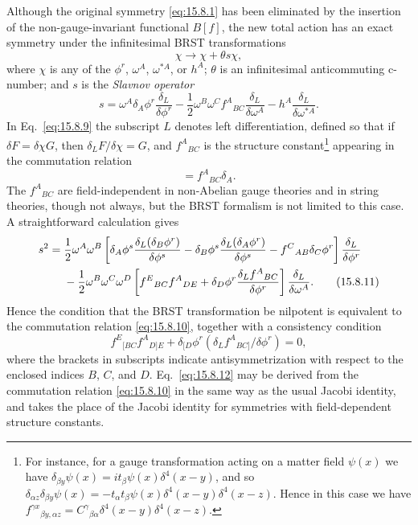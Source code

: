 Although the original symmetry \eqref{eq:15.8.1} has been eliminated by the insertion of the non-gauge-invariant functional $B[f]$, the new total action has an exact symmetry under the infinitesimal BRST transformations
\begin{equation}
 \chi\longrightarrow\chi+\theta s\chi,
 \tag{15.8.8}\label{eq:15.8.8}
\end{equation}
where $\chi$ is any of the $\phi^r$, $\omega^A$, $\omega^{*A}$, or $h^A$; $\theta$ is an infinitesimal anticommuting c-number; and $s$ is the \emph{Slavnov operator}
\begin{equation}
 s=\omega^A\delta_A\phi^r\frac{\delta_L}{\delta\phi^r}
 -\frac{1}{2}\omega^B\omega^Cf^A{}_{BC}\frac{\delta_L}{\delta\omega^A}
 -h^A\frac{\delta_L}{\delta\omega^{*A}}.
 \tag{15.8.9}\label{eq:15.8.9}
\end{equation}
In Eq.~\eqref{eq:15.8.9} the subscript $L$ denotes left differentiation, defined so that if $\delta F=\delta\chi G$, then $\delta_LF/\delta\chi=G$, and $f^A{}_{BC}$ is the structure constant\footnote{For instance, for a gauge transformation acting on a matter field $\psi(x)$ we have $\delta_{\beta y}\psi(x)=it_\beta\psi(x)\delta^4(x-y)$, and so $\delta_{\alpha z}\delta_{\beta y}\psi(x)=-t_\alpha t_\beta\psi(x)\delta^4(x-y)\delta^4(x-z)$. Hence in this case we have $f^{\gamma x}{}_{\beta y,\alpha z}=C^\gamma{}_{\beta\alpha}\delta^4(x-y)\delta^4(x-z)$.} appearing in the commutation relation
\begin{equation}
 [\delta_B,\delta_C]=f^A{}_{BC}\delta_A.
 \tag{15.8.10}\label{eq:15.8.10}
\end{equation}
The $f^A{}_{BC}$ are field-independent in non-Abelian gauge theories and in string theories, though not always, but the BRST formalism is not limited to this case. A straightforward calculation gives
\begin{align}
 s^2={}&\frac{1}{2}\omega^A\omega^B
 \left[\delta_A\phi^s\frac{\delta_L(\delta_B\phi^r)}{\delta\phi^s}
 -\delta_B\phi^s\frac{\delta_L(\delta_A\phi^r)}{\delta\phi^s}
 -f^C{}_{AB}\delta_C\phi^r\right]\frac{\delta_L}{\delta\phi^r}\notag\\
 &-\frac{1}{2}\omega^B\omega^C\omega^D
 \left[f^E{}_{BC}f^A{}_{DE}
 +\delta_D\phi^r\frac{\delta_Lf^A{}_{BC}}{\delta\phi^r}\right]
 \frac{\delta_L}{\delta\omega^A}.
 \tag{15.8.11}\label{eq:15.8.11}
\end{align}
Hence the condition that the BRST transformation be nilpotent is equivalent to the commutation relation \eqref{eq:15.8.10}, together with a consistency condition
\begin{equation}
 f^E{}_{[BC}f^A{}_{D]E}
 +\delta_{[D}\phi^r\left(\delta_Lf^A{}_{BC]}/\delta\phi^r\right)=0,
 \tag{15.8.12}\label{eq:15.8.12}
\end{equation}
where the brackets in subscripts indicate antisymmetrization with respect to the enclosed indices $B$, $C$, and $D$. Eq.~\eqref{eq:15.8.12} may be derived from the commutation relation \eqref{eq:15.8.10} in the same way as the usual Jacobi identity, and takes the place of the Jacobi identity for symmetries with field-dependent structure constants.

